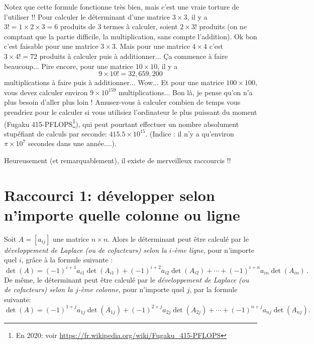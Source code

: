Notez que cette formule fonctionne très bien, mais c'est une vraie torture de l'utiliser !\!!  
Pour calculer le déterminant d'une matrice $3\times 3$, il y a $3!=1\times 2\times 3=6$ produits de 3 termes à calculer, soient $2\times 3!$ produits
(on ne comptant que la partie difficile, la multiplication, sans compte l'addition).  Ok bon c'est faisable pour une matrice $3\times 3$. Mais pour une matrice $4\times 4$
c'est $3\times 4!=72$ produits à calculer puis à additionner... Ça commence à faire beaucoup...
Pire encore, pour une matrice $10\times 10$, il y a
$$
9\times 10! = 32,659,200  
$$
multiplications à faire puis à additionner... Wow... Et pour une matrice $100 \times 100$, vous devez calculer environ $9 \times 10^{159}$ multiplications... Bon là, je pense qu'on n'a plus besoin d'aller plus loin ! Amusez-vous à calculer combien de temps vous prendriez pour le calculer si
vous utilisiez l'ordinateur le plus puissant du moment  (Fugaku 415-PFLOPS\footnote{En  2020: voir {\color{blue}\url{https://fr.wikipedia.org/wiki/Fugaku_415-PFLOPS}}}), qui peut pourtant
effectuer un nombre absolument stupéfiant de calculs par seconde: $415.5\times  10^{15}$.
(Indice : il n'y a qu'environ $\pi \times 10^{7}$ secondes dans une année....).

Heureusement (et remarquablement), il existe de merveilleux raccourcis !\!!

\section{Raccourci 1: d\'evelopper selon n'importe quelle colonne ou ligne}

\begin{theorem}
Soit $A = [a_{ij}]$ une matrice $n\times n$.  Alors le déterminant peut être calculé par le \emph{développement de Laplace (ou de cofacteurs)
selon la $i$-\`eme ligne}, pour n'importe quel $i$, grâce à la formule suivante :
$$
\det(A) = (-1)^{i+1}a_{i1}\det(A_{i1}) + (-1)^{i+2}a_{i2}\det(A_{i2}) + \cdots + (-1)^{i+n}a_{in}\det(A_{in})\,.
$$
De m\^eme, le déterminant peut être calculé par le \emph{développement de Laplace (ou de cofacteurs)
selon la $j$-\`eme colonne}, pour n'importe quel $j$, par la formule suivante:
$$
\det(A) = (-1)^{1+j}a_{1j}\det(A_{1j}) + (-1)^{2+j}a_{2j}\det(A_{2j}) + \cdots + (-1)^{n+j}a_{nj}\det(A_{nj}).
$$
\end{theorem}

